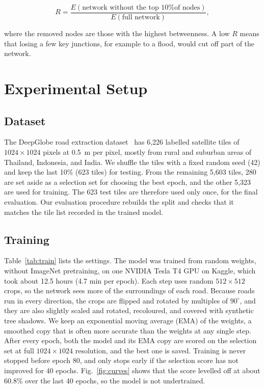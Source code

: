\documentclass{ieeeaccess}
\begin{document}
\begin{equation}
R = \frac{E(\text{network without the top 10\% of nodes})}{E(\text{full network})},
\label{eq:resilience}
\end{equation}

where the removed nodes are those with the highest betweenness. A low $R$ means that losing a few key junctions, for example to a flood, would cut off part of the network.

\section{Experimental Setup}
\label{sec:setup}

\subsection{Dataset}

The DeepGlobe road extraction dataset~\cite{demir2018deepglobe} has 6,226 labelled satellite tiles of $1024 \times 1024$ pixels at 0.5~m per pixel, mostly from rural and suburban areas of Thailand, Indonesia, and India. We shuffle the tiles with a fixed random seed (42) and keep the last 10\% (623 tiles) for testing. From the remaining 5,603 tiles, 280 are set aside as a selection set for choosing the best epoch, and the other 5,323 are used for training. The 623 test tiles are therefore used only once, for the final evaluation. Our evaluation procedure rebuilds the split and checks that it matches the tile list recorded in the trained model.

\subsection{Training}

Table~\ref{tab:train} lists the settings. The model was trained from random weights, without ImageNet pretraining, on one NVIDIA Tesla T4 GPU on Kaggle, which took about 12.5 hours (4.7 min per epoch). Each step uses random $512 \times 512$ crops, so the network sees more of the surroundings of each road. Because roads run in every direction, the crops are flipped and rotated by multiples of $90^{\circ}$, and they are also slightly scaled and rotated, recoloured, and covered with synthetic tree shadows. We keep an exponential moving average (EMA) of the weights, a smoothed copy that is often more accurate than the weights at any single step. After every epoch, both the model and its EMA copy are scored on the selection set at full $1024 \times 1024$ resolution, and the best one is saved. Training is never stopped before epoch 80, and only stops early if the selection score has not improved for 40 epochs. Fig.~\ref{fig:curves} shows that the score levelled off at about 60.8\% over the last 40 epochs, so the model is not undertrained.
\end{document}
